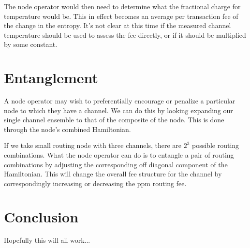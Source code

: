 \documentclass[review,12pt]{elsarticle}
\begin{document}
The node operator would then need to determine what the fractional charge for temperature would be.
This in effect becomes an average per transaction fee of the change in the entropy.
It's not clear at this time if the measured channel temperature should be used to assess the fee directly, or if it should be multiplied by some constant.

\section{Entanglement}
A node operator may wish to preferentially encourage or penalize a particular node to which they have a channel.
We can do this by looking expanding our single channel ensemble to that of the composite of the node.
This is done through the node's combined Hamiltonian.

If we take small routing node with three channels, there are $2^3$ possible routing combinations.
What the node operator can do is to entangle a pair of routing combinations by adjusting the corresponding off diagonal component of the Hamiltonian.
This will change the overall fee structure for the channel by correspondingly increasing or decreasing the ppm routing fee.

\section{Conclusion}
Hopefully this will all work...




\end{document}
